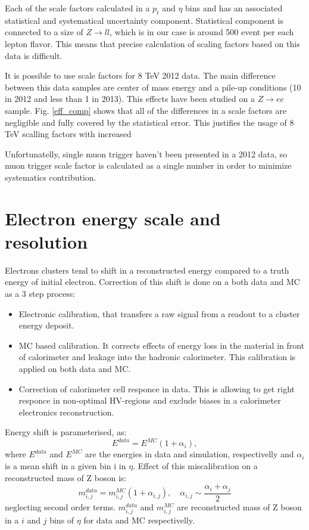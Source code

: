 Each of the scale factors calculated in a $p_{t}$ and $\eta$ bins and has an associated statistical and systematical uncertainty component. Statistical component is connected to a size of $Z\to ll$, which is in our case is around 500 event per each lepton flavor. This means that precise calculation of scaling factors based on this data is difficult.

It is possible to use scale factors for 8 TeV 2012 data. The main difference between this data samples are center of mass energy and a pile-up conditions (10 in 2012 and less than 1 in 2013). This effects have been studied on a $Z\to ee$ sample. Fig. \ref{eff_comp} shows that all of the differences in a scale factors are negligible and fully covered by the statistical error. This justifies the usage of 8 TeV scalling factors with increased 

Unfortunatelly, single muon trigger haven't been presented in a 2012 data, so muon trigger scale factor is calculated as a single number in order to minimize systematics contribution. 
\section{Electron energy scale and resolution}
Electrons clusters tend to shift in a reconstructed energy compared to a truth energy of initial electron. Correction of this shift is done on a both data and MC as a 3 step process:
\begin{itemize}
\item Electronic calibration, that transfers a raw signal from a readout to a cluster energy deposit.
\item MC based calibration. It corrects effects of energy loss in the material in front of calorimeter and leakage into the hadronic calorimeter. This calibration is applied on both data and MC.
\item Correction of calorimeter cell responce in data. This is allowing to get right responce in non-optimal HV-regions and exclude biases in a calorimeter electronics reconstruction.
\end{itemize}

Energy shift is parameterised, as:
\begin{equation}
E^{data}=E^{MC}(1+\alpha_i),
\end{equation}
where $E^{data}$ and $E^{MC}$ are the energies in data and simulation, respectivelly and $\alpha_i$ is a mean shift in a given bin i in $\eta$. Effect of this miscalibration on a reconstructed mass of Z boson is:
\begin{equation}
m_{i,j}^{data}=m_{i,j}^{MC}(1+\alpha_{i,j}), \quad \alpha_{i,j} \sim \frac{\alpha_i+\alpha_j}{2}
\end{equation}
neglecting second order terms. $m_{i,j}^{data}$ and $m_{i,j}^{MC}$ are reconstructed mass of Z boson in a $i$ and $j$ bins of $\eta$ for data and MC respectivelly. 

